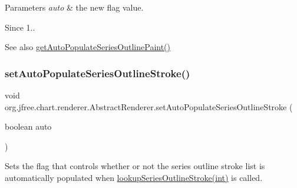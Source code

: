 \begin{DoxyParams}{Parameters}
{\em auto} & the new flag value.\\
\hline
\end{DoxyParams}
\begin{DoxySince}{Since}
1..
\end{DoxySince}
\begin{DoxySeeAlso}{See also}
\mbox{\hyperlink{classorg_1_1jfree_1_1chart_1_1renderer_1_1_abstract_renderer_ab1e91f057f52655aafe373c454e5f828}{get\+Auto\+Populate\+Series\+Outline\+Paint()}} 
\end{DoxySeeAlso}
\mbox{\label{classorg_1_1jfree_1_1chart_1_1renderer_1_1_abstract_renderer_a4014d0855f984a12057d5045d736fa0a}} 
\subsubsection{\texorpdfstring{set\+Auto\+Populate\+Series\+Outline\+Stroke()}{setAutoPopulateSeriesOutlineStroke()}}
{\footnotesize\ttfamily void org.\+jfree.\+chart.\+renderer.\+Abstract\+Renderer.\+set\+Auto\+Populate\+Series\+Outline\+Stroke (\begin{DoxyParamCaption}\item[{boolean}]{auto }\end{DoxyParamCaption})}

Sets the flag that controls whether or not the series outline stroke list is automatically populated when \mbox{\hyperlink{classorg_1_1jfree_1_1chart_1_1renderer_1_1_abstract_renderer_aab0f5b5e5cc74fae532800cd503c3612}{lookup\+Series\+Outline\+Stroke(int)}} is called.


